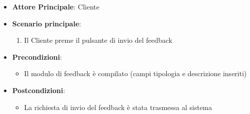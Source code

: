 \label{uc_23.3}
\begin{itemize}
    \item \textbf{Attore Principale}: Cliente
	\item \textbf{Scenario principale}:
	\begin{enumerate}
		\item Il Cliente preme il pulsante di invio del feedback
	\end{enumerate}
	\item \textbf{Precondizioni}:
	\begin{itemize}
		\item Il modulo di feedback è compilato (campi tipologia e descrizione inseriti)
	\end{itemize}
	\item \textbf{Postcondizioni}:
	\begin{itemize}
		\item La richiesta di invio del feedback è stata trasmessa al sistema
	\end{itemize}
\end{itemize}
